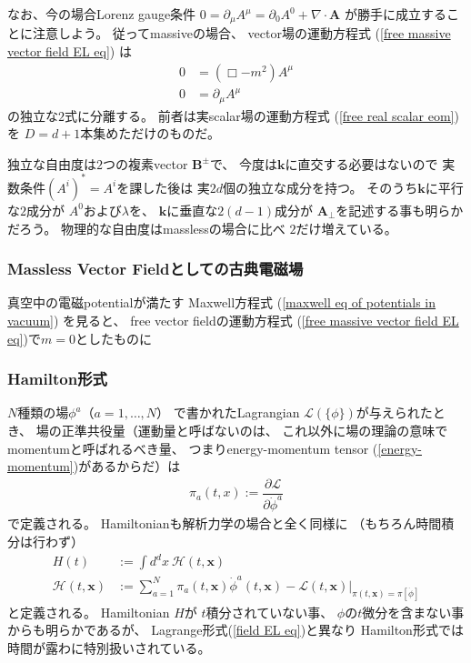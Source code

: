 \begin{enumerate}
    なお、今の場合Lorenz gauge条件
    $0 = \partial_\mu A^\mu
    = \partial_0 A^0 + \nabla \cdot \bm{A}$
    が勝手に成立することに注意しよう。
    従ってmassiveの場合、
    vector場の運動方程式
    (\ref{free massive vector field EL eq})
    は
    \begin{subequations}
    \begin{align}
        0
    &=
        (\Box - m^2) A^\mu
    \\
        0
    &=
        \partial_\mu A^\mu
    \end{align}
    \end{subequations}
    の独立な$2$式に分離する。
    前者は実scalar場の運動方程式
    (\ref{free real scalar eom})を
    $D = d + 1$本集めただけのものだ。

    独立な自由度は$2$つの複素vector $\bm{B}^\pm$で、
    今度は$\bm{k}$に直交する必要はないので
    実数条件$(A^i)^* = A^i$を課した後は
    実$2d$個の独立な成分を持つ。
    そのうち$\bm{k}$に平行な$2$成分が
    $A^0$および$\lambda$を、
    $\bm{k}$に垂直な$2(d-1)$成分が
    $\bm{A}_\perp$を記述する事も明らかだろう。
    物理的な自由度はmasslessの場合に比べ
    $2$だけ増えている。
\end{enumerate}

\subsubsection{Massless Vector Fieldとしての古典電磁場}

真空中の電磁potentialが満たす
Maxwell方程式
(\ref{maxwell eq of potentials in vacuum})
を見ると、
free vector fieldの運動方程式
(\ref{free massive vector field EL eq})で$m = 0$としたものに

\subsubsection{Hamilton形式}

$N$種類の場$\phi^a$（$a = 1, \dots, N$）
で書かれたLagrangian
$\mathcal{L}(\{ \phi \})$が与えられたとき、
場の正準共役量（運動量と呼ばないのは、
これ以外に場の理論の意味でmomentumと呼ばれるべき量、
つまりenergy-momentum tensor (\ref{energy-momentum})があるからだ）は
\begin{align}
    \pi_a (t, x)
    := \dfrac{\partial \mathcal{L}}
        {\partial \dot{\phi}^a}
\end{align}
で定義される。
Hamiltonianも解析力学の場合と全く同様に
（もちろん時間積分は行わず）
\begin{subequations}
\begin{align}
    H (t)
    &:=
    \int d^d x\ 
        \mathcal{H} (t, \bm{x})
\\
    \mathcal{H} (t, \bm{x})
    &:=
    \sum_{a = 1}^N
        \pi_a (t, \bm{x})
        \dot{\phi}^a (t, \bm{x})
    -
    \mathcal{L}(t, \bm{x})
    \bigg|_{
        \pi(t, \bm{x})
        = \pi[\dot{\phi}]
    }
\end{align}
\end{subequations}
と定義される。
Hamiltonian $H$が
$t$積分されていない事、
$\phi$の$t$微分を含まない事からも明らかであるが、
Lagrange形式(\ref{field EL eq})と異なり
Hamilton形式では時間が露わに特別扱いされている。

